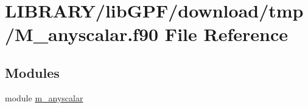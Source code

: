 \hypertarget{M__anyscalar_8f90}{}\section{L\+I\+B\+R\+A\+R\+Y/lib\+G\+P\+F/download/tmp/\+M\+\_\+anyscalar.f90 File Reference}
\label{M__anyscalar_8f90}
\subsection*{Modules}
\begin{DoxyCompactItemize}
\item 
module \hyperlink{namespacem__anyscalar}{m\+\_\+anyscalar}
\end{DoxyCompactItemize}
